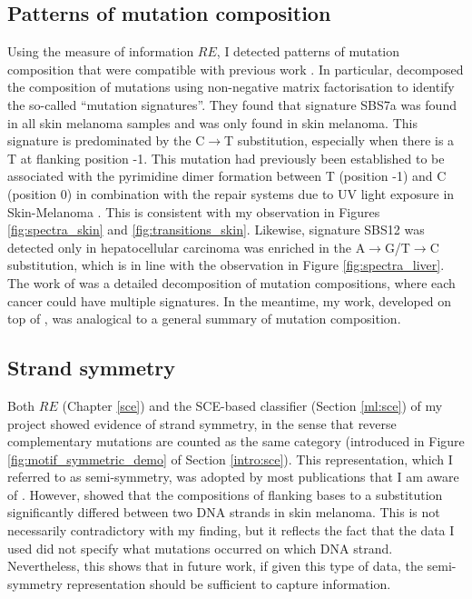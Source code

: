 \subsection{Patterns of mutation composition}
Using the measure of information $RE$, I detected patterns of mutation composition that were compatible with previous work \citep[Chapter \ref{sce};][]{Alexandrov2020}. In particular, \citet{Alexandrov2020} decomposed the composition of mutations using non-negative matrix factorisation to identify the so-called ``mutation signatures''. They found that signature SBS7a was found in all skin melanoma samples and was only found in skin melanoma. This signature is predominated by the C$\rightarrow$T substitution, especially when there is a T at flanking position -1. This mutation had previously been established to be associated with the pyrimidine dimer formation between T (position -1) and C (position 0) in combination with the repair systems due to UV light exposure in Skin-Melanoma \citep{Pfeifer2005MutationsLight}. This is consistent with my observation in Figures \ref{fig:spectra_skin} and \ref{fig:transitions_skin}. Likewise, signature SBS12 was detected only in hepatocellular carcinoma was enriched in the A$\rightarrow$G/T$\rightarrow$C substitution, which is in line with the observation in Figure \ref{fig:spectra_liver}. The work of \citet{Alexandrov2020} was a detailed decomposition of mutation compositions, where each cancer could have multiple signatures. In the meantime, my work, developed on top of \citet{Zhu2017}, was analogical to a general summary of mutation composition. 

\subsection{Strand symmetry}
Both $RE$ (Chapter \ref{sce}) and the SCE-based classifier (Section \ref{ml:sce}) of my project showed evidence of strand symmetry, in the sense that reverse complementary mutations are counted as the same category (introduced in Figure \ref{fig:motif_symmetric_demo} of Section \ref{intro:sce}). This representation, which I referred to as semi-symmetry, was adopted by most publications that I am aware of \citep{Alexandrov2020,Jiao2020,Zhang2020}. However, \citet{Zhu2017} showed that the compositions of flanking bases to a substitution significantly differed between two DNA strands in skin melanoma. This is not necessarily contradictory with my finding, but it reflects the fact that the data I used did not specify what mutations occurred on which DNA strand. Nevertheless, this shows that in future work, if given this type of data, the semi-symmetry representation should be sufficient to capture information.

